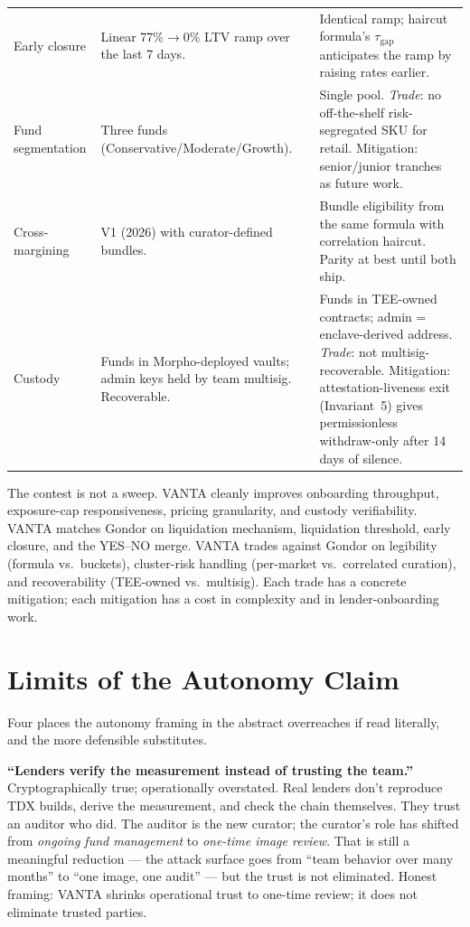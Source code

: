 \documentclass[11pt,letterpaper]{article}
\begin{document}
\begin{table}[h]
\begin{tabularx}{\textwidth}{@{}p{}p{}X@{}}
Early closure & Linear 77\%$\to$0\% LTV ramp over the last 7 days. & Identical ramp; haircut formula's $\tau_{\mathrm{gap}}$ anticipates the ramp by raising rates earlier. \\
Fund segmentation & Three funds (Conservative/Moderate/Growth). & Single pool. \emph{Trade}: no off-the-shelf risk-segregated SKU for retail. Mitigation: senior/junior tranches as future work. \\
Cross-margining & V1 (2026) with curator-defined bundles. & Bundle eligibility from the same formula with correlation haircut. Parity at best until both ship. \\
Custody & Funds in Morpho-deployed vaults; admin keys held by team multisig. Recoverable. & Funds in TEE-owned contracts; admin = enclave-derived address. \emph{Trade}: not multisig-recoverable. Mitigation: attestation-liveness exit (Invariant~5) gives permissionless withdraw-only after 14 days of silence. \\
\bottomrule
\end{tabularx}
\end{table}

The contest is not a sweep. VANTA cleanly improves onboarding throughput, exposure-cap responsiveness, pricing granularity, and custody verifiability. VANTA matches Gondor on liquidation mechanism, liquidation threshold, early closure, and the YES--NO merge. VANTA trades against Gondor on legibility (formula vs.\ buckets), cluster-risk handling (per-market vs.\ correlated curation), and recoverability (TEE-owned vs.\ multisig). Each trade has a concrete mitigation; each mitigation has a cost in complexity and in lender-onboarding work.

\section{Limits of the Autonomy Claim}
\label{sec:limits}

Four places the autonomy framing in the abstract overreaches if read literally, and the more defensible substitutes.

\textbf{``Lenders verify the measurement instead of trusting the team.''} Cryptographically true; operationally overstated. Real lenders don't reproduce TDX builds, derive the measurement, and check the chain themselves. They trust an auditor who did. The auditor is the new curator; the curator's role has shifted from \emph{ongoing fund management} to \emph{one-time image review}. That is still a meaningful reduction --- the attack surface goes from ``team behavior over many months'' to ``one image, one audit'' --- but the trust is not eliminated. Honest framing: VANTA shrinks operational trust to one-time review; it does not eliminate trusted parties.
\end{document}
